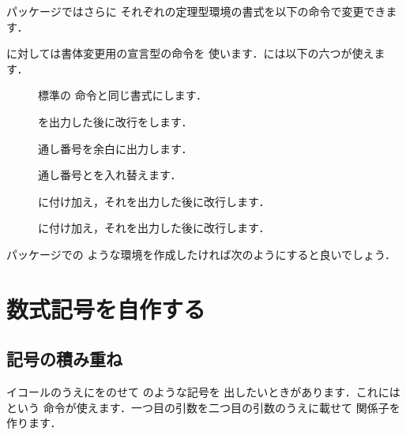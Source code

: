 {{パッケージではさらに
それぞれの定理型環境の書式を以下の命令で変更できます．
\begin{usage}
\theoremstyle{$\<スタイル>$}
\end{usage}

に対しては書体変更用の宣言型の命令を
使います．には以下の六つが使えます．
\begin{description}
\item[] 
   標準の 命令と同じ書式にします．
\item[] 
   を出力した後に改行をします．
\item[] 
   通し番号を余白に出力します．
\item[]
   通し番号とを入れ替えます．
\item[] 
  に付け加え，それを出力した後に改行します．
\item[]
  に付け加え，それを出力した後に改行します．
\end{description}
パッケージでの
ような環境を作成したければ次のようにすると良いでしょう．

\begin{intext}
{\theorembodyfont{\normalfont}
\theoremheaderfont{\normalfont\bfseries}
\newtheorem{Exam}{例題}
\newtheorem{Refer}[Exam]{参考}
\newtheorem{Prob}[Exam]{問題}}
\end{intext}

\section{数式記号を自作する}

\subsection{記号の積み重ね}
%
イコール\qu{$=$}のうえにをのせて
のような記号を
出したいときがあります．これには  という
命令が使えます．一つ目の引数を二つ目の引数のうえに載せて
関係子を作ります．
\begin{usage}
\end{usage}

}}

